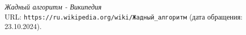  
\begin{thebibliography}{99}
	
	{\itshape Жадный алгоритм - Википедия} \\URL: \texttt{https://ru.wikipedia.org/wiki/Жадный\_алгоритм} (дата обращения: 23.10.2024).
	
\end{thebibliography}
\pagebreak